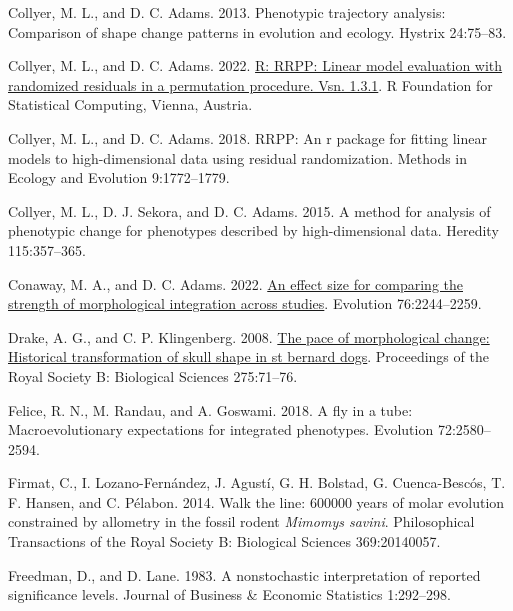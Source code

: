 \documentclass[
  11pt,
]{article}
\newlength{\cslhangindent}
\newlength{\cslentryspacingunit} %
\newenvironment{CSLReferences}[2] %
 {%
  \setlength{\parindent}{0pt}
  \ifodd #1
  \let\oldpar\par
  \def\par{\hangindent=\cslhangindent\oldpar}
  \fi
  \setlength{\parskip}{#2\cslentryspacingunit}
 }%
 {}
\begin{document}
\begin{CSLReferences}{1}{0}
\leavevmode{}%
Collyer, M. L., and D. C. Adams. 2013. Phenotypic trajectory analysis:
Comparison of shape change patterns in evolution and ecology. Hystrix
24:75--83.

\leavevmode{}%
Collyer, M. L., and D. C. Adams. 2022.
\href{https://CRAN.R-project.org/package=RRPP}{R: RRPP: Linear model
evaluation with randomized residuals in a permutation procedure. Vsn.
1.3.1}. R Foundation for Statistical Computing, Vienna, Austria.

\leavevmode{}%
Collyer, M. L., and D. C. Adams. 2018. RRPP: An r package for fitting
linear models to high-dimensional data using residual randomization.
Methods in Ecology and Evolution 9:1772--1779.

\leavevmode{}%
Collyer, M. L., D. J. Sekora, and D. C. Adams. 2015. A method for
analysis of phenotypic change for phenotypes described by
high-dimensional data. Heredity 115:357--365.

\leavevmode{}%
Conaway, M. A., and D. C. Adams. 2022.
\href{https://doi.org/10.1111/evo.14595}{An effect size for comparing
the strength of morphological integration across studies}. Evolution
76:2244--2259.

\leavevmode{}%
Drake, A. G., and C. P. Klingenberg. 2008.
\href{https://doi.org/10.1098/rspb.2007.1169}{The pace of morphological
change: Historical transformation of skull shape in st bernard dogs}.
Proceedings of the Royal Society B: Biological Sciences 275:71--76.

\leavevmode{}%
Felice, R. N., M. Randau, and A. Goswami. 2018. A fly in a tube:
Macroevolutionary expectations for integrated phenotypes. Evolution
72:2580--2594.

\leavevmode{}%
Firmat, C., I. Lozano-Fernández, J. Agustí, G. H. Bolstad, G.
Cuenca-Bescós, T. F. Hansen, and C. Pélabon. 2014. Walk the line: 600000
years of molar evolution constrained by allometry in the fossil rodent
\emph{{M}imomys savini}. Philosophical Transactions of the Royal Society
B: Biological Sciences 369:20140057.

\leavevmode{}%
Freedman, D., and D. Lane. 1983. A nonstochastic interpretation of
reported significance levels. Journal of Business {\&} Economic
Statistics 1:292--298.


\end{CSLReferences}
\end{document}
